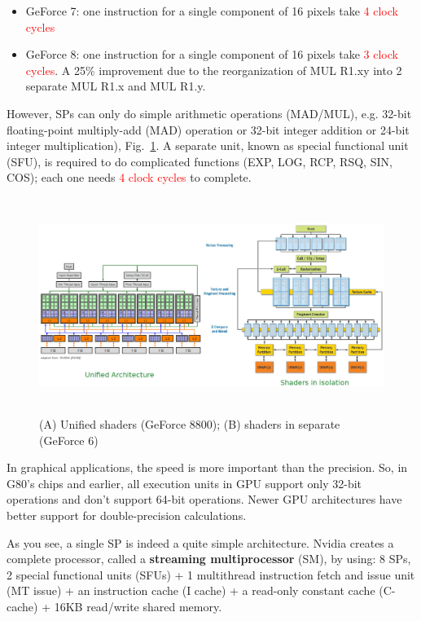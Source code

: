 \begin{itemize}
\item GeForce 7: one instruction for a single component of 16 pixels
  take \textcolor{red}{4 clock cycles}
\item GeForce 8: one instruction for a single component of 16 pixels
  take \textcolor{red}{3 clock cycles}. A 25\% improvement due to the
  reorganization of MUL R1.xy into 2 separate MUL R1.x and MUL R1.y.
\end{itemize}
However, SPs can only do simple arithmetic operations (MAD/MUL),
e.g. 32-bit floating-point multiply-add (MAD) operation or 32-bit
integer addition or 24-bit integer multiplication),
Fig.~\ref{fig:unified_shader}. A separate unit, known as special functional unit
(SFU), is required to do complicated functions (EXP, LOG, RCP, RSQ, SIN, COS);
each one needs \textcolor{red}{4 clock cycles} to complete.

\begin{figure}[hbt]
  \centerline{\includegraphics[height=7cm, angle=0]{./images/unified_shaders.eps}}
  \caption{(A) Unified shaders (GeForce 8800); (B) shaders in separate
    (GeForce 6)}
  \label{fig:unified_shader}
\end{figure}

\begin{framed}
  In graphical applications, the speed is more important than the
  precision. So, in G80's chips and earlier, all execution units in
  GPU support only 32-bit operations and don't support 64-bit
  operations. Newer GPU architectures have better support for double-precision
  calculations.
\end{framed}

As you see, a single SP is indeed a quite simple architecture. Nvidia creates a
complete processor, called a {\bf streaming multiprocessor} (SM), by using: 8
SPs, 2 special functional units (SFUs) + 1 multithread instruction fetch and
issue unit (MT issue) + an instruction cache (I cache) + a read-only constant
cache (C-cache) + 16KB read/write shared memory.

